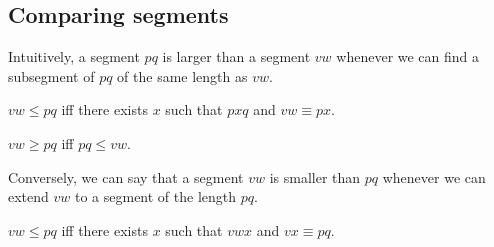 \documentclass{article}
\newcommand{\Cong}[4]{#1 #2 \equiv #3 #4}
\newcommand{\Betw}[3]{#1 #2 #3}
\newcommand{\Leq}[4]{#1 #2 \leq #3 #4}
\newcommand{\Geq}[4]{#1 #2 \geq #3 #4}
\begin{document}
  \subsection{Comparing segments}

  Intuitively, a segment $pq$ is larger than a segment $vw$ whenever we can find a subsegment
  of $pq$ of the same length as $vw$.

  \begin{forthel}
    \begin{definition} %
      $\Leq{v}{w}{p}{q}$ iff there exists $x$ such that $\Betw{p}{x}{q}$ and $\Cong{v}{w}{p}{x}$.
    \end{definition}

    \begin{definition} %
      $\Geq{v}{w}{p}{q}$ iff $\Leq{p}{q}{v}{w}$.
    \end{definition}
  \end{forthel}

  Conversely, we can say that a segment $vw$ is smaller than $pq$ whenever we can extend $vw$
  to a segment of the length $pq$.

    \begin{axiom} %
      $\Leq{v}{w}{p}{q}$ iff there exists $x$ such that $\Betw{v}{w}{x}$ and $\Cong{v}{x}{p}{q}$.
    \end{axiom}
\end{document}
